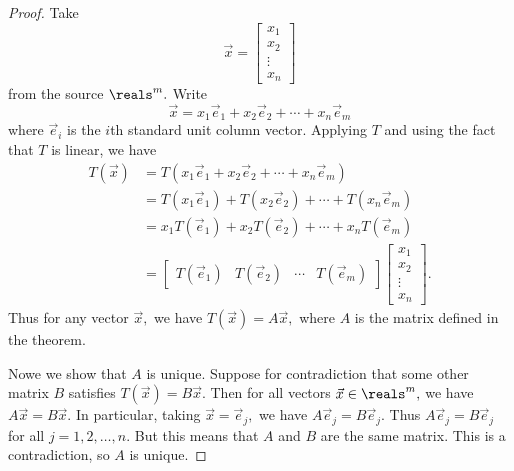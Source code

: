 \begin{proof}
    Take $$\vec{x} = \begin{bmatrix} x_1 \\ x_2 \\ \vdots \\ x_n \end{bmatrix}$$ from the source $\reals^m.$ Write $$\vec{x} = x_1\vec{e}_1 + x_2\vec{e}_2 + \cdots + x_n\vec{e}_m$$ where $\vec{e}_i$ is the $i$th standard unit column vector. Applying $T$ and using the fact that $T$ is linear, we have
    \begin{align*}
        T(\vec{x}) &= T(x_1\vec{e}_1 + x_2\vec{e}_2 + \cdots + x_n\vec{e}_m) \\
        &= T(x_1\vec{e}_1) + T(x_2\vec{e}_2) + \cdots + T(x_n\vec{e}_m) \\
        &= x_1T(\vec{e}_1) + x_2T(\vec{e}_2) + \cdots + x_nT(\vec{e}_m) \\
        &= \begin{bmatrix} T(\vec{e}_1) & T(\vec{e}_2) & \cdots & T(\vec{e}_m) \end{bmatrix} \begin{bmatrix} x_1 \\ x_2 \\ \vdots \\ x_n \end{bmatrix}.
    \end{align*}
    Thus for any vector $\vec{x},$ we have $T(\vec{x})=A\vec{x},$ where $A$ is the matrix defined in the theorem.

    Nowe we show that $A$ is unique. Suppose for contradiction that some other matrix $B$ satisfies $T(\vec{x})=B\vec{x}.$ Then for all vectors $\vec{x}\in\reals^m,$ we have $A\vec{x}=B\vec{x}.$ In particular, taking $\vec{x}=\vec{e}_j,$ we have $A\vec{e}_j=B\vec{e}_j.$ Thus $A\vec{e}_j=B\vec{e}_j$ for all $j=1,2,\ldots,n.$ But this means that $A$ and $B$ are the same matrix. This is a contradiction, so $A$ is unique.
\end{proof}